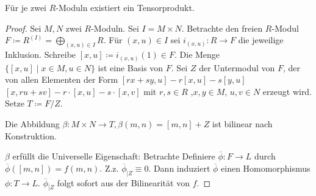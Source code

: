 \documentclass[../main.tex]{subfiles}
\begin{document}
\begin{theorem}
    Für je zwei $R$-Moduln existiert ein Tensorprodukt.
\end{theorem}
\begin{proof}
    Sei $M,N$ zwei $R$-Moduln. Sei $I=M\times N$.
    Betrachte den freien $R$-Modul $F\coloneqq R^{(I)} = \bigoplus_{(x,u)\in I} R$.
    Für $(x,u)\in I$ sei $i_{(x,u)}:R\rightarrow F$ die jeweilige Inklusion.
    Schreibe $[x,u] \coloneqq i_{(x,u)} (1)\in F$.
    Die Menge $\{[x,u]\mid x\in M, u\in N\}$ ist eine Basis von $F$.
    Sei $Z$ der Untermodul von $F$, der von allen Elementen der Form $[rx+sy,u] - r[x,u] - s[y,u]$
    $[x, ru+sv] - r\cdot [x,u] - s\cdot [x,v]$ mit $r,s\in R$ ,$x,y\in M$, $u,v\in N$ erzeugt wird.
    Setze $T\coloneqq F/Z.$

    Die Abbildung $\beta:M\times N \rightarrow T, \beta(m,n) = [m,n]+Z$ ist bilinear nach Konstruktion.

    $\beta$ erfüllt die Universelle Eigenschaft:
    Betrachte 
    Definiere $\overline{\phi}:F\rightarrow L$ durch $\overline{\phi} ([m,n]) = f(m,n)$.
    Z.z. $\overline{\phi}_{|Z} \equiv 0$. Dann induziert $\overline{\phi}$ einen Homomorphismus $\phi: T\rightarrow L$.
    $\overline{\phi}_{|Z}$ folgt sofort aus der Bilinearität von $f$.
\end{proof}
\end{document}
